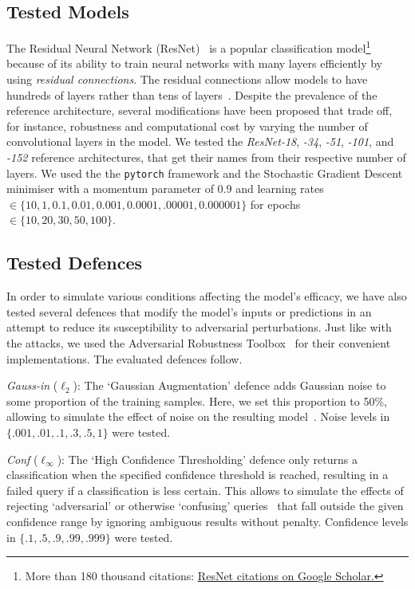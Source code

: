 \subsection{Tested Models}
\label{models}

The Residual Neural Network (ResNet)~\cite{resnet} is a popular classification model\footnote{More than 180 thousand citations: \href{https://scholar.google.com/scholar?cites=9281510746729853742}{ResNet citations on Google Scholar.}} because of its ability to train neural networks with many layers efficiently by using \textit{residual connections}.
The residual connections allow models to have hundreds of layers rather than tens of layers~\cite{resnet,vgg}.
Despite the prevalence of the reference architecture, several modifications have been proposed that trade off, for instance, robustness and computational cost by varying the number of convolutional layers in the model.
We tested the \textit{ResNet-18}, \textit{-34}, \textit{-51}, \textit{-101}, and \textit{-152} reference architectures, that get their names from their respective number of layers.
We used the the \texttt{pytorch} framework and the Stochastic Gradient Descent minimiser with a momentum parameter of 0.9 and learning rates $\in \{10, 1, 0.1, 0.01, 0.001, 0.0001, .00001, 0.000001\}$ for epochs $\in \{ 10, 20, 30, 50, 100\}$.

\subsection{Tested Defences}
\label{defences}

In order to simulate various conditions affecting the model's efficacy, we have also tested several defences that modify the model's inputs or predictions in an attempt to reduce its susceptibility to adversarial perturbations.
Just like with the attacks, we used the Adversarial Robustness Toolbox~\cite{art2018} for their convenient implementations. The evaluated defences follow.


\textit{Gauss-in} ($\ell_2$): The `Gaussian Augmentation' defence adds Gaussian noise to some proportion of the training samples.
Here, we set this proportion to 50\%, allowing to simulate the effect of noise on the resulting model~\cite{gauss_aug}.
Noise levels in $\{.001, .01, .1, .3, .5, 1\}$ were tested.


\textit{Conf} ($\ell_{\infty}$): The `High Confidence Thresholding' defence only returns a classification when the specified confidence threshold is reached, resulting in a failed query if a classification is less certain.
This allows to simulate the effects of rejecting `adversarial' or otherwise `confusing' queries~\cite{high_conf} that fall outside the given confidence range by ignoring ambiguous results without penalty.
Confidence levels in $\{.1, .5, .9, .99, .999\}$ were tested.


